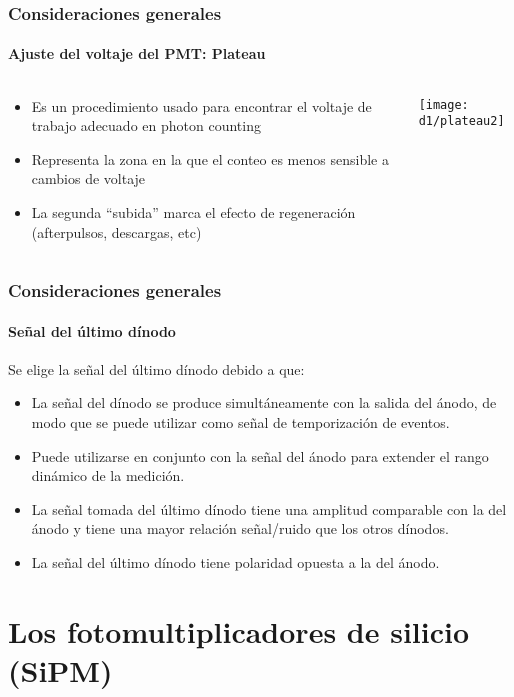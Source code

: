 \documentclass{beamer}
\begin{document}
\begin{frame}
\frametitle{Consideraciones generales}
\framesubtitle{Ajuste del voltaje del PMT: Plateau}
\begin{columns}
\begin{column}{0.5\textwidth}
\begin{itemize}
\item Es un procedimiento usado para encontrar el voltaje de trabajo adecuado en
photon counting 
\item Representa la zona en la que el conteo es menos sensible a cambios de
voltaje 
\item La segunda ``subida'' marca el efecto de regeneraci\'on (afterpulsos,
descargas, etc)
\end{itemize}
\end{column}
\begin{column}{0.5\textwidth}
\begin{center}
\texttt{[image: d1/plateau2]}
\end{center}
\end{column}
\end{columns}
\end{frame}

\begin{frame}
\frametitle{Consideraciones generales}
\framesubtitle{Señal del \'ultimo d\'inodo}
\begin{block}{Se elige la señal del \'ultimo d\'inodo debido a que:}
\begin{itemize}
\item La señal del d\'inodo se produce simult\'aneamente con la
salida del \'anodo, de modo que se puede utilizar como
señal de temporizaci\'on de eventos.
\item Puede utilizarse en conjunto con la señal del \'anodo para
extender el rango din\'amico de la medici\'on.
\item La señal tomada del \'ultimo d\'inodo tiene una amplitud
comparable con la del \'anodo y tiene una mayor relaci\'on
señal/ruido que los otros d\'inodos.
\item La señal del \'ultimo d\'inodo tiene polaridad opuesta a la
del \'anodo.
\end{itemize}
\end{block}
\end{frame}

\section{Los fotomultiplicadores de silicio (SiPM)}
\end{document}

